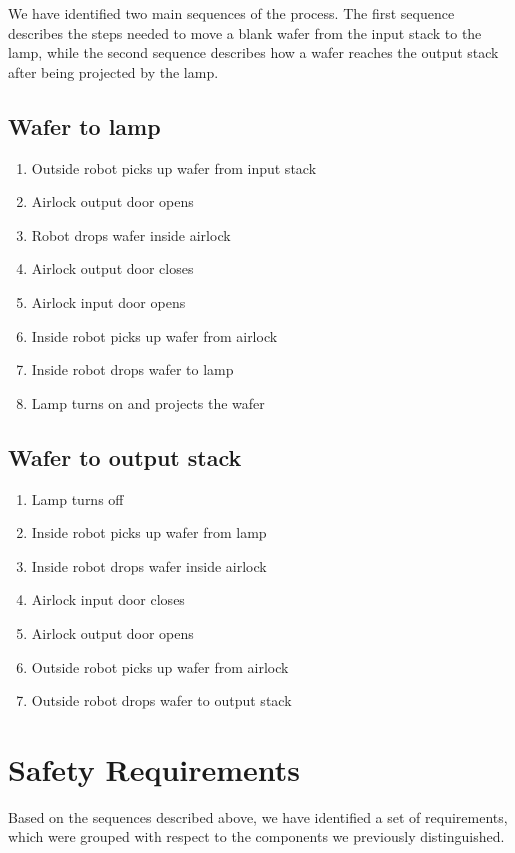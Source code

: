 We have identified two main sequences of the process. The first sequence describes the steps needed to move a blank wafer from the input stack to the lamp, while the second sequence describes how a wafer reaches the output stack after being projected by the lamp.

\subsection{Wafer to lamp}
\begin{enumerate}
    \item Outside robot picks up wafer from input stack
    \item Airlock output door opens
    \item Robot drops wafer inside airlock
    \item Airlock output door closes
    \item Airlock input door opens
    \item Inside robot picks up wafer from airlock
    \item Inside robot drops wafer to lamp
    \item Lamp turns on and projects the wafer
\end{enumerate}

\subsection{Wafer to output stack}
\begin{enumerate}
    \item Lamp turns off
    \item Inside robot picks up wafer from lamp
    \item Inside robot drops wafer inside airlock
    \item Airlock input door closes
    \item Airlock output door opens
    \item Outside robot picks up wafer from airlock
    \item Outside robot drops wafer to output stack
\end{enumerate}

\section{Safety Requirements}

Based on the sequences described above, we have identified a set of requirements, which were grouped with respect to the components we previously distinguished. 

